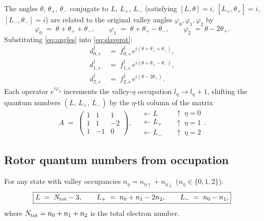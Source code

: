 \documentclass[11pt,a4paper]{article}
\newcommand{\ua}{\uparrow}
\newcommand{\da}{\downarrow}
\begin{document}
The angles $\theta,\,\theta_+,\,\theta_-$ conjugate to $L,\,L_+,\,L_-$
(satisfying $[L,\theta]=i$, $[L_+,\theta_+]=i$, $[L_-,\theta_-]=i$) are
related to the original valley angles $\varphi_0,\varphi_1,\varphi_2$ by
\begin{equation}
  \varphi_0 \;=\; \theta+\theta_++\theta_-,\qquad
  \varphi_1 \;=\; \theta+\theta_+-\theta_-,\qquad
  \varphi_2 \;=\; \theta-2\theta_+.
  \label{eq:angles}
\end{equation}
Substituting \eqref{eq:angles} into \eqref{eq:slaverot}:
\begin{align}
  d^{\dagger}_{0,s}
  &\;=\;
  f^{\dagger}_{0,s}\,e^{i(\theta+\theta_++\theta_-)}, \\[4pt]
  d^{\dagger}_{1,s}
  &\;=\;
  f^{\dagger}_{1,s}\,e^{i(\theta+\theta_+-\theta_-)}, \\[4pt]
  d^{\dagger}_{2,s}
  &\;=\;
  f^{\dagger}_{2,s}\,e^{i(\theta-2\theta_+)}.
\end{align}
Each operator $e^{i\varphi_\eta}$ increments the valley-$\eta$ occupation
$l_\eta\to l_\eta+1$, shifting the quantum numbers
$(L,\,L_+,\,L_-)$ by the $\eta$-th column of the matrix
\begin{equation}
  A
  \;=\;
  \begin{pmatrix}1&1&1\\1&1&{-2}\\1&{-1}&0\end{pmatrix},
  \quad
  \begin{matrix}
    \leftarrow L \\
    \leftarrow L_+ \\
    \leftarrow L_-
  \end{matrix}
  \quad
  \begin{matrix}
    \uparrow\;\eta{=}0 \\
    \uparrow\;\eta{=}1 \\
    \uparrow\;\eta{=}2
  \end{matrix}.
\end{equation}

\subsection*{Rotor quantum numbers from occupation}

For any state with valley occupancies $n_\eta = n_{\eta\ua}+n_{\eta\da}$
($n_\eta\in\{0,1,2\}$):
\begin{equation}
  \boxed{
  L \;=\; N_{\rm tot}-3,\qquad
  L_+ \;=\; n_0+n_1-2n_2,\qquad
  L_- \;=\; n_0-n_1,
  }
  \label{eq:qnums}
\end{equation}
where $N_{\rm tot}=n_0+n_1+n_2$ is the total electron number.
\end{document}
